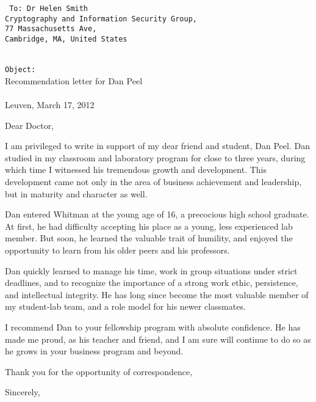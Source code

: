\documentclass[a4paper,11pt]{article}
\begin{document}
\begin{multicols}{2}
\hfill\vfill
\columnbreak
{
\tt \fontsize{10.5}{14}
To: Dr Helen Smith\\
Cryptography and Information Security Group,\\
77 Massachusetts Ave,\\
Cambridge, MA, United States
\\\\
}
\end{multicols}

\begin{multicols}{2}
{\tt Object:}\\ 
Recommendation letter for Dan Peel
\\\\
Leuven, March 17, 2012
\end{multicols}

Dear Doctor, 

I am privileged to write in support of my dear friend and student, Dan Peel. Dan studied in my classroom and
laboratory program for close to three years, during which time I witnessed his tremendous growth and development. This
development came not only in the area of business achievement and leadership, but in maturity and character as well.

Dan entered Whitman at the young age of 16, a precocious high school graduate. At first, he had difficulty accepting his
place as a young, less experienced lab member. But soon, he learned the valuable trait of humility, and enjoyed the
opportunity to learn from his older peers and his professors.

Dan quickly learned to manage his time, work in group situations under strict deadlines, and to recognize the importance
of a strong work ethic, persistence, and intellectual integrity. He has long since become the most valuable member of
my student-lab team, and a role model for his newer classmates.

I recommend Dan to your fellowship program with absolute confidence. He has made me proud, as his teacher and friend,
and I am sure will continue to do so as he grows in your business program and beyond.

Thank you for the opportunity of correspondence,

Sincerely,
\end{document}
